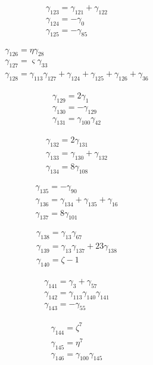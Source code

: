 \[\begin{aligned}\gamma_{123}=\gamma_{121} + \gamma_{122}\\ \gamma_{124}=- \gamma_{0}\\ \gamma_{125}=- \gamma_{85}\end{aligned}\]

\[\begin{aligned}\gamma_{126}=\eta  \gamma_{28}\\ \gamma_{127}=\varsigma  \gamma_{33}\\ \gamma_{128}=\gamma_{113} \gamma_{127} + \gamma_{124} + \gamma_{125} + \gamma_{126} + \gamma_{36}\end{aligned}\]

\[\begin{aligned}\gamma_{129}=2 \gamma_{1}\\ \gamma_{130}=- \gamma_{129}\\ \gamma_{131}=\gamma_{100} \gamma_{42}\end{aligned}\]

\[\begin{aligned}\gamma_{132}=2 \gamma_{131}\\ \gamma_{133}=\gamma_{130} + \gamma_{132}\\ \gamma_{134}=8 \gamma_{108}\end{aligned}\]

\[\begin{aligned}\gamma_{135}=- \gamma_{90}\\ \gamma_{136}=\gamma_{134} + \gamma_{135} + \gamma_{16}\\ \gamma_{137}=8 \gamma_{101}\end{aligned}\]

\[\begin{aligned}\gamma_{138}=\gamma_{13} \gamma_{67}\\ \gamma_{139}=\gamma_{13} \gamma_{137} + 23 \gamma_{138}\\ \gamma_{140}=\zeta  - 1\end{aligned}\]

\[\begin{aligned}\gamma_{141}=\gamma_{3} + \gamma_{57}\\ \gamma_{142}=\gamma_{113} \gamma_{140} \gamma_{141}\\ \gamma_{143}=- \gamma_{55}\end{aligned}\]

\[\begin{aligned}\gamma_{144}=\zeta ^{7}\\ \gamma_{145}=\eta ^{7}\\ \gamma_{146}=\gamma_{100} \gamma_{145}\end{aligned}\]

